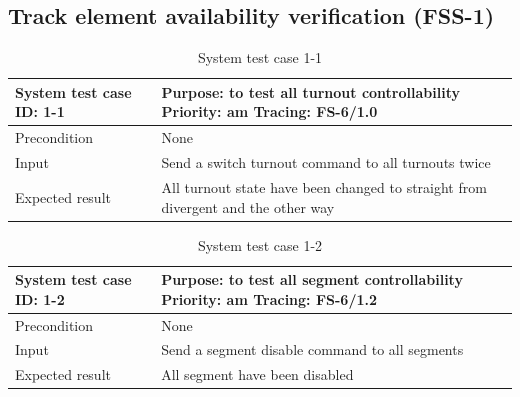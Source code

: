 \subsection{Track element availability verification (FSS-1)}
\begin{table}[H]
	\caption{System test case 1-1}
	\label{table:TCase-FSS1-1}
	\begin{center}
		\renewcommand{\arraystretch}{1.8}
		\begin{tabu} 
			to 0.9 \textwidth
			{  X[0.3, l] X[l] }
			\toprule
			System test case ID: 1-1 & Purpose: to test all turnout controllability    \newline Priority: am \newline Tracing: FS-6/1.0 \\ \midrule
			Precondition             & None                                                                                             \\
			Input                    & Send a switch turnout command to all turnouts twice                                              \\
			Expected result          & All turnout state have been changed to straight from divergent and the other way                 \\ \bottomrule
		\end{tabu}
	\end{center}
\end{table}

\begin{table}[H]
	\caption{System test case 1-2}
	\label{table:TCase-FSS1-2}
	\begin{center}
		\renewcommand{\arraystretch}{1.8}
		\begin{tabu} 
			to 0.9 \textwidth
			{  X[0.3, l] X[l] }
			\toprule
			System test case ID: 1-2 & Purpose: to test all segment controllability \newline Priority: am \newline Tracing: FS-6/1.2 \\ \midrule
			Precondition             & None                                                                                          \\
			Input                    & Send a segment disable command to all segments                                                \\
			Expected result          & All segment have been disabled                                                                \\ \bottomrule
		\end{tabu}
	\end{center}
\end{table}

